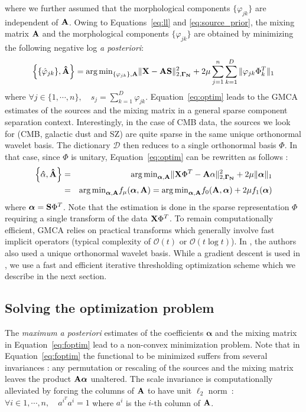 where we further assumed that the morphological components $\{\varphi_{jk}\}$ are independent of ${\bf A}$. Owing to Equations~\ref{eq:ll} 
and \ref{eq:source_prior}, the mixing matrix ${\bf A}$ and the morphological components $\{\varphi_{jk}\}$ are obtained by minimizing 
the following negative log \textit{a posteriori}:
\begin{equation}
\label{eq:optim}
\left\{\{\hat{\varphi}_{jk}\},{\bf \hat{A}}\right\} = {\arg\min}_{\{\varphi_{jk}\},{\bf A}}\|{\bf X} - {\bf AS}\|_{2,{\bf \Gamma_N}}^2 + 2 \mu \sum_{j=1}^n \sum_{k=1}^D \|\varphi_{jk}\Phi_k^T\|_1
\end{equation}
where $\forall j \in \{1,\cdots,n\},\quad s_j = \sum_{k=1}^D \varphi_{jk}$. Equation~\ref{eq:optim} leads to the GMCA estimates 
of the sources and the mixing matrix in a general sparse component separation context. Interestingly, in the case of CMB data, 
the sources we look for (CMB, galactic dust and SZ) are quite sparse in the same unique orthonormal wavelet basis. The dictionary
$\mathcal{D}$ then reduces to a single orthonormal basis $\Phi$. In that case, since $\Phi$ is unitary, Equation~\ref{eq:optim} 
can be rewritten as follows :
\begin{eqnarray}
\label{eq:foptim}
\left\{{\bf \hat{\alpha}},{\bf \hat{A}}\right\} &=& {\arg\min}_{{\boldsymbol \alpha},{\bf A}} \|{\bf X}\Phi^T - {\bf A\alpha}\|_{2,{\bf \Gamma_N}}^2 + 2 \mu \|{\boldsymbol \alpha}\|_1 \nonumber \\
						&=& {\arg\min}_{{\boldsymbol \alpha},{\bf A}} f_\mu({\boldsymbol \alpha},{\bf A}) = {\arg\min}_{{\boldsymbol \alpha},{\bf A}} f_0({\bf A}, {\boldsymbol \alpha}) + 2\mu f_1({\boldsymbol \alpha})
\end{eqnarray}
where ${\boldsymbol \alpha} = {\bf S}\Phi^T$. Note that the estimation is done in the sparse representation $\Phi$ requiring a single 
transform of the data ${\bf X}\Phi^T$. To remain computationally efficient, GMCA relies on practical transforms which generally involve 
fast implicit operators (typical complexity of $\mathcal{O}\left(t\right)$ or $\mathcal{O}\left(t \log t \right)$). In \cite{Zibu}, 
the authors also used a unique orthonormal wavelet basis. While a gradient descent is used in \cite{Zibu}, we use a fast and efficient 
iterative thresholding optimization scheme which we describe in the next section.

\subsection{Solving the optimization problem}
\label{sec:algo}
The \textit{maximum a posteriori} estimates of the coefficients ${\boldsymbol \alpha}$ and the mixing matrix in Equation~\ref{eq:foptim} 
lead to a non-convex minimization problem. Note that in Equation~\ref{eq:foptim} the functional to be minimized suffers from several 
invariances : any permutation or rescaling of the sources and the mixing matrix leaves the product $\bf A{\boldsymbol \alpha}$ unaltered. 
The scale invariance is computationally alleviated by forcing the columns of ${\bf A}$ to have unit $\ell_2$ norm~: $\forall i\in{1,\cdots,n},\quad a^{i^T}a^i = 1$ 
where $a^i$ is the $i$-th column of ${\bf A}$. 

